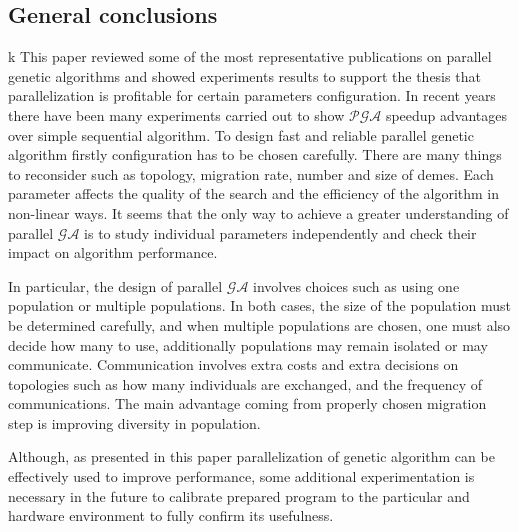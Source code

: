 \subsection{General conclusions}
k
This paper reviewed some of the most representative publications on parallel
genetic algorithms and showed experiments results to support the thesis that
parallelization is profitable for certain parameters configuration. 
In recent years there have been many experiments carried 
out to show $\mathcal{PGA}$ speedup advantages over simple sequential algorithm. To design
fast and reliable parallel genetic algorithm firstly configuration has to be
chosen carefully. There are many things to reconsider such as topology,
migration rate, number and size of demes. Each parameter affects the quality of
the search and the efficiency of the algorithm in non-linear ways. It seems that
the only way to achieve a greater understanding of parallel $\mathcal{GA}$ is to
study individual parameters independently and check their impact on algorithm
performance.

In particular, the design of parallel $\mathcal{GA}$ involves choices such as using one
population or multiple populations. In both cases, the size of the population
must be determined carefully, and when multiple populations are chosen, one
must also decide how many to use, additionally populations may remain isolated
or may communicate. Communication involves extra costs and extra
decisions on topologies such as how many individuals are exchanged, and the
frequency of communications. The main advantage coming from properly chosen
migration step is improving  diversity in population.

Although, as presented in this paper parallelization of genetic algorithm can be
effectively used to improve performance, some additional experimentation is
necessary in the future to calibrate prepared program to the
particular and hardware environment to fully confirm its usefulness.
